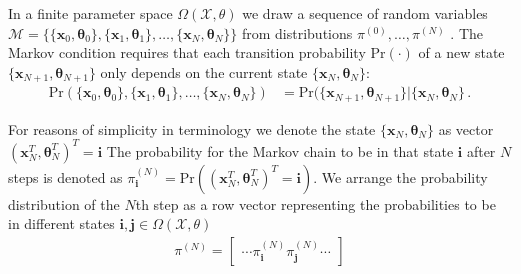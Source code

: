 
In a finite parameter space $\Omega(\mathcal{X},\mathcal{\theta})$ we draw a sequence of random variables  $ \mathcal{M} = \big \{ \{ \bm{x}_0, \bm{\theta}_0 \} , \{ \bm{x}_1, \bm{\theta}_1 \} , \dots , \{ \bm{x}_N, \bm{\theta}_N \} \big \}$ from distributions $ \pi^{(0)}, \dots , \pi^{(N)}$  .
The Markov condition requires that each transition probability $\text{Pr}(\cdot)$ of a new state $\{ \bm{x}_{N+1}, \bm{\theta}_{N+1} \}$ only depends on the current state $\{ \bm{x}_{N}, \bm{\theta}_{N}\}$:
\begin{align}
    \text{Pr}(\{ \bm{x}_0, \bm{\theta}_0 \} , \{ \bm{x}_1, \bm{\theta}_1 \} , \dots , \{ \bm{x}_N, \bm{\theta}_N \}) &=  \text{Pr}(\{ \bm{x}_{N+1}, \bm{\theta}_{N+1} \}| \{ \bm{x}_N, \bm{\theta}_N \} \, .
\end{align}

For reasons of simplicity in terminology we denote the state $\{ \bm{x}_N, \bm{\theta}_N \}$ as vector $(\bm{x}^T_N, \bm{\theta}^T_N )^T = \bm{i}$
The probability for the Markov chain to be in that state $\bm{i}$ after $N$ steps is denoted as $\pi^{(N)}_{\bm{i}} = \text{Pr}( (\bm{x}^T_N, \bm{\theta}^T_N )^T = \bm{i})$.
We arrange the probability distribution of the $N$th step as a row vector representing the probabilities to be in different states $\bm{i},\bm{j} \in \Omega( \mathcal{X}, \mathcal{\theta} )$
\begin{align}
     \pi^{(N)} = \begin{bmatrix}
          \cdots 
           \pi^{(N)}_{\bm{i}} 
          \pi^{(N)}_{\bm{j}} 
          \cdots 
         \end{bmatrix}
\end{align}



